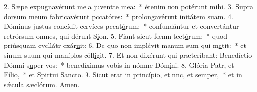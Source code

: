 2. Sæpe expugnavérunt me a juventte m\uline{e}a:~* étenim non potérunt m\uline{i}hi.
3. Supra dorsum meum fabricavérunt pccat\uline{ó}res:~* prolongavérunt initátem s\uline{u}am.
4. Dóminus justus concídit cervíces pccat\uline{ó}rum:~* confundántur et convertántur retrórsum omnes, qui dérunt S\uline{i}on.
5. Fiant sicut fœnm tect\uline{ó}rum:~* quod priúsquam evellátr exár\uline{u}it:
6. De quo non implévit manum sum qui m\uline{e}tit:~* et sinum suum qui maníplos cóll\uline{i}git.
7. Et non dixérunt qui præteríbant: Benedíctio Dómni s\uline{u}per vos:~* benedíximus vobis in nómne Dóm\uline{i}ni.
8. Glória Patr, et F\uline{í}lio,~* et Spirtui S\uline{a}ncto.
9. Sicut erat in princípio, et nnc, et s\uline{e}mper,~* et in sǽcula sæclórum. \uline{A}men.
